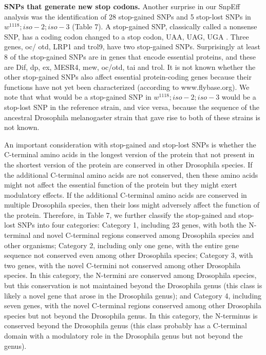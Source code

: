 \textbf{SNPs that generate new stop codons.} Another surprise in our SnpEff analysis was the identification of 28 stop-gained SNPs and 5 stop-lost SNPs in $w^{1118} ; iso-2; iso-3$ (Table 7). A stop-gained SNP, classically called a nonsense SNP, has a coding codon changed to a stop codon, UAA, UAG, UGA \cite{brenner1965genetic}. Three genes, oc/ otd, LRP1 and trol9, have two stop-gained SNPs. Surprisingly at least 8 of the stop-gained SNPs are in genes that encode essential proteins, and these are Dif, dp, ex, MESR4, mew, oc/otd, tai and trol. It is not known whether the other stop-gained SNPs also affect essential protein-coding genes because their functions have not yet been characterized (according to www.flybase.org). We note that what would be a stop-gained SNP in $w^{1118} ; iso-2; iso-3$ would be a stop-lost SNP in the reference strain, and vice versa, because the sequence of the ancestral Drosophila melanogaster strain that gave rise to both of these strains is not known.

An important consideration with stop-gained and stop-lost SNPs is whether the C-terminal amino acids in the longest version of the protein that not present in the shortest version of the protein are conserved in other Drosophila species. If the additional C-terminal amino acids are not conserved, then these amino acids might not affect the essential function of the protein but they might exert modulatory effects. If the additional C-terminal amino acids are conserved in multiple Drosophila species, then their loss might adversely affect the function of the protein. Therefore, in Table 7, we further classify the stop-gained and stop-lost SNPs into four categories: Category 1, including 23 genes, with both the N-terminal and novel C-terminal regions conserved among Drosophila species and other organisms; Category 2, including only one gene, with the entire gene sequence not conserved even among other Drosophila species; Category 3, with two genes, with the novel C-termini not conserved among other Drosophila species. In this category, the N-termini are conserved among Drosophila species, but this conservation is not maintained beyond the Drosophila genus (this class is likely a novel gene that arose in the Drosophila genus); and Category 4, including seven genes, with the novel C-terminal regions conserved among other Drosophila species but not beyond the Drosophila genus. In this category, the N-terminus is conserved beyond the Drosophila genus (this class probably has a C-terminal domain with a modulatory role in the Drosophila genus but not beyond the genus).

